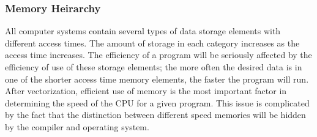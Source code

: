 \subsubsection{Memory Heirarchy }
All computer systems contain several types of data storage elements
with different access times.  The amount of storage in each category
increases as the access time increases.  The efficiency of a program
will be seriously affected by the efficiency of use of these storage
elements; the more often the desired data is in one of the shorter
access time memory elements, the faster the program will run. After
vectorization, efficient use of memory is the most important factor in
determining the speed of the CPU for a given program. This issue is
complicated by the fact that the distinction between different speed
memories will be hidden by the compiler and operating system.

